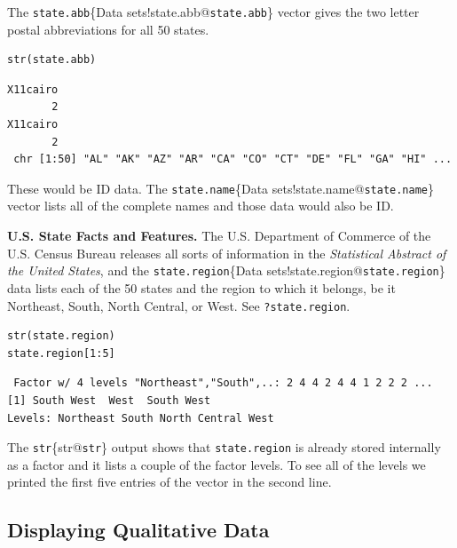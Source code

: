 \documentclass[10pt,english]{scrbook}
\begin{document}
\begin{exampletoo}

The \texttt{state.abb}\index\{Data sets!state.abb@\texttt{state.abb}\}
vector gives the two letter postal abbreviations for all 50 states.

\begin{verbatim}
str(state.abb)
\end{verbatim}

\begin{verbatim}
X11cairo 
       2
X11cairo 
       2
 chr [1:50] "AL" "AK" "AZ" "AR" "CA" "CO" "CT" "DE" "FL" "GA" "HI" ...
\end{verbatim}

These would be ID data. The \texttt{state.name}\index\{Data sets!state.name@\texttt{state.name}\} vector lists all of the complete names and those data would also be ID.
\end{exampletoo}

\begin{exampletoo}

\textbf{U.S. State Facts and Features.} The U.S. Department of Commerce of the U.S. Census Bureau releases all sorts of information in the \emph{Statistical Abstract of the United States}, and the \texttt{state.region}\index\{Data sets!state.region@\texttt{state.region}\} data lists each of the 50 states and the region to which it belongs, be it Northeast, South, North Central, or West. See \texttt{?state.region}.

\begin{verbatim}
str(state.region)
state.region[1:5]
\end{verbatim}

\begin{verbatim}
 Factor w/ 4 levels "Northeast","South",..: 2 4 4 2 4 4 1 2 2 2 ...
[1] South West  West  South West 
Levels: Northeast South North Central West
\end{verbatim}

The \texttt{str}\index\{str@\texttt{str}\} output shows that \texttt{state.region} is already stored internally as a factor and it lists a couple of the factor levels. To see all of the levels we printed the first five entries of the vector in the second line.
\end{exampletoo}

\subsection[Displaying Qualitative Data]{Displaying Qualitative Data}
\label{sec-1-1-4}
\end{document}
